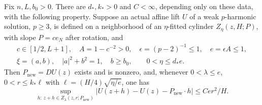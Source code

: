 \begin{lemma}\label{lem:coarse-cylinder}
Fix $n,L,b_0>0$. There are $d_*,k_*>0$ and $C<\infty$, depending
only on these data, with the following property. Suppose an actual
affine lift $U$ of a weak $p$-harmonic solution, $p\geq3$,
is defined on a neighborhood of an $\eta$-fitted cylinder
$Z_\eta(z,H;P)$, with slope $P=ce_N$ after rotation, and
\begin{equation}\label{eq:coarse-hyp}
 \begin{gathered}
 c\in[1/2,L+1],\quad A=1-c^{-2}>0,\quad
 \epsilon=(p-2)^{-1}\leq1,\quad e=\epsilon A\leq1,\\
 \xi=(a,b),\quad |a|^2+b^2=1,\quad b\geq b_0,\qquad 0<\eta\leq d_*e.
 \end{gathered}
\end{equation}
Then $P_{\mathrm{new}}=DU(z)$ exists and is nonzero, and, whenever
$0<\lambda\leq e$, $0<r\leq k_*\ell$ with
$\ell=(H/4)\sqrt{\eta/e}$, one has
\begin{equation}\label{eq:cylinder-estimate}
 \sup_{h:\,z+h\in Z_\lambda(z,r;P_{\mathrm{new}})}
 |U(z+h)-U(z)-P_{\mathrm{new}}\cdot h|\leq Ce r^2/H.
\end{equation}
\end{lemma}
